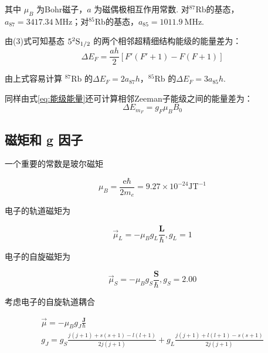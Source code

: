 \documentclass[10pt,hyperref,a4paper,UTF8]{ctexart}
\begin{document}
                其中 $\mu_{B}$ 为Bohr磁子，$a$ 为磁偶极相互作用常数. 对$^{87}\mathrm{Rb}$的基态，$a_{87}=3417.34\ \mathrm{MHz}$；对$^{85}\mathrm{Rb}$的基态，$a_{85}=1011.9\ \mathrm{MHz}$.

                由(3)式可知基态 $5 ^{2}\rm S_{1/2}$ 的两个相邻超精细结构能级的能量差为：
                \begin{equation}
                        \Delta E_{F}=\frac{ah}{2}\left[F'(F'+1)-F(F+1)\right]
                \end{equation}

                由上式容易计算 $^{87}\mathrm{Rb}$ 的$\Delta E_{F}=2a_{87}h$，$^{85}\mathrm{Rb}$ 的$\Delta E_{F}=3a_{85}h$.

                同样由式\ref{eq:能级能量}还可计算相邻Zeeman子能级之间的能量差为：
                \begin{equation}\label{eq:Zeeman能级差}
                        \Delta E_{m_{F}}=g_{F}\mu_{B}B_{0}
                \end{equation}

        \subsection{磁矩和 g 因子}
        一个重要的常数是玻尔磁矩

        \begin{equation}
        \mu_{B}=\frac{\mathrm{e} \hbar}{2 m_{e}}=9.27 \times 10^{-24} \mathrm{JT}^{-1}
        \end{equation}

        电子的轨道磁矩为

        \begin{equation}
        \vec{\mu}_{L}=-\mu_{B} g_{L} \frac{\mathbf{L}}{\hbar}, g_{L}=1
        \end{equation}

        电子的自旋磁矩为

        \begin{equation}
        \vec{\mu}_{S}=-\mu_{B} g_{S} \frac{\mathbf{S}}{\hbar}, g_{S}=2.00
        \end{equation}

        考虑电子的自旋轨道耦合

        \begin{equation}
        \begin{gathered}
        \vec{\mu}=-\mu_{B} g_{J} \frac{\mathbf{J}}{\hbar} \\
        g_{J}=g_{S} \frac{j(j+1)+s(s+1)-l(l+1)}{2 j(j+1)}+g_{L} \frac{j(j+1)+l(l+1)-s(s+1)}{2 j(j+1)}
        \end{gathered}
        \end{equation}
\end{document}

